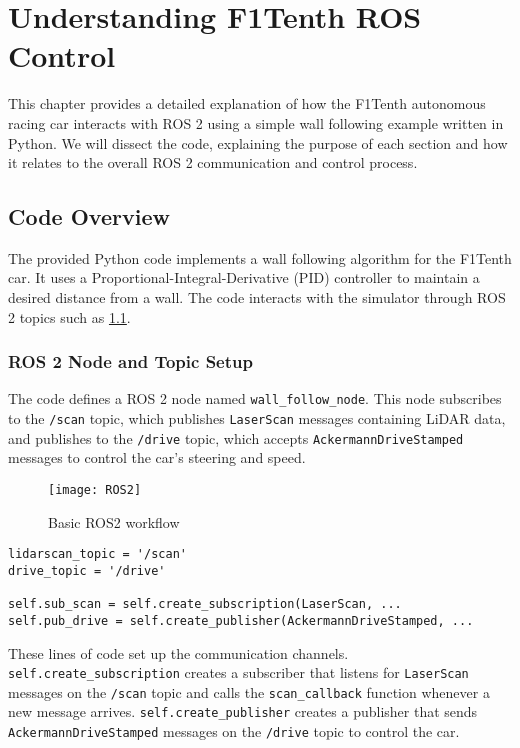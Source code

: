 \chapter{Understanding F1Tenth ROS Control}

This chapter provides a detailed explanation of how the F1Tenth autonomous racing car interacts with ROS 2 using a simple wall following example written in Python.  We will dissect the code, explaining the purpose of each section and how it relates to the overall ROS 2 communication and control process.

\section{Code Overview}

The provided Python code implements a wall following algorithm for the F1Tenth car. It uses a Proportional-Integral-Derivative (PID) controller to maintain a desired distance from a wall.  The code interacts with the simulator through ROS 2 topics such as \ref{fig:ros}.

\subsection{ROS 2 Node and Topic Setup}

The code defines a ROS 2 node named \texttt{wall\_follow\_node}.  This node subscribes to the \texttt{/scan} topic, which publishes \texttt{LaserScan} messages containing LiDAR data, and publishes to the \texttt{/drive} topic, which accepts \texttt{AckermannDriveStamped} messages to control the car's steering and speed.

\begin{figure}
    \centering
    \texttt{[image: ROS2]}
    \caption{Basic ROS2 workflow}
    \label{fig:ros}
\end{figure}

\begin{verbatim}
lidarscan_topic = '/scan'
drive_topic = '/drive'

self.sub_scan = self.create_subscription(LaserScan, ...
self.pub_drive = self.create_publisher(AckermannDriveStamped, ...
\end{verbatim}

These lines of code set up the communication channels.  \texttt{self.create\_subscription} creates a subscriber that listens for \texttt{LaserScan} messages on the \texttt{/scan} topic and calls the \texttt{scan\_callback} function whenever a new message arrives.  \texttt{self.create\_publisher} creates a publisher that sends \texttt{AckermannDriveStamped} messages on the \texttt{/drive} topic to control the car.


